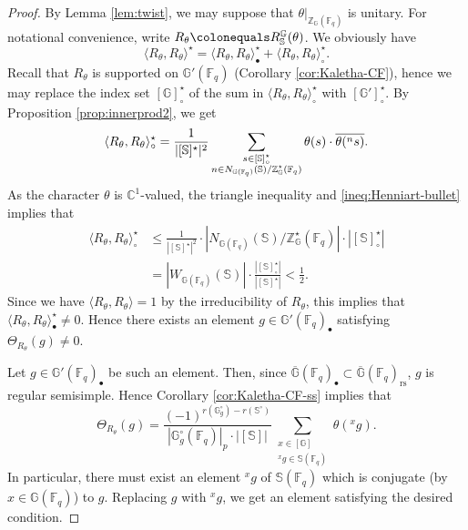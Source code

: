 \documentclass{amsart}
\newcommand{\rs}{\mathrm{rs}}
\newcommand{\F}{\mathbb{F}}
\newcommand{\FF}{\mathbb{F}}
\newcommand{\C}{\mathbb{C}}
\newcommand{\bbS}{\mathbb{S}}
\newcommand{\bbG}{\mathbb{G}}
\newcommand{\bbZ}{\mathbb{Z}}
\theoremstyle{plain}
\theoremstyle{definition}
\theoremstyle{remark}
\theoremstyle{theorem}
\begin{document}
\begin{proof}
By Lemma \ref{lem:twist}, we may suppose that $\theta|_{\bbZ_{\bbG}(\F_{q})}$ is unitary.
For notational convenience, write $R_\theta \colonequals R_{\bbS}^{\bbG}(\theta)$.
We obviously have
\[
\langle R_{\theta},R_{\theta}\rangle^{\star}
=
\langle R_{\theta},R_{\theta}\rangle^{\star}_{\bullet}
+
\langle R_{\theta},R_{\theta}\rangle^{\star}_{\circ}.
\]
Recall that $R_{\theta}$ is supported on $\bbG'(\F_{q})$ (Corollary \ref{cor:Kaletha-CF}), hence we may replace the index set $[\bbG]^{\star}_{\circ}$ of the sum in $\langle R_{\theta},R_{\theta}\rangle^{\star}_{\circ}$ with $[\bbG']^{\star}_{\circ}$.
By Proposition \ref{prop:innerprod2}, we get
\[
\langle R_{\theta},R_{\theta}\rangle^{\star}_{\circ}
=
\frac{1}{|[\bbS]^{\star}|^{2}}
\sum_{\begin{subarray}{c}s\in[\bbS]^{\star}_{\circ} \\ n\in N_{\bbG(\F_{q})}(\bbS)/\bbZ^{\star}_{\bbG}(\F_{q})\end{subarray}}
\theta(s)\cdot\overline{\theta({}^{n}s)}.
\]
As the character $\theta$ is $\C^{1}$-valued, the triangle inequality and \eqref{ineq:Henniart-bullet} implies that
\begin{align*}
\langle R_{\theta},R_{\theta}\rangle^{\star}_{\circ}
&\leq
\frac{1}{|[\bbS]^{\star}|^{2}}
\cdot|N_{\bbG(\F_{q})}(\bbS)/\bbZ^{\star}_{\bbG}(\F_{q})|
\cdot|[\bbS]^{\star}_{\circ}|\\
&=
|W_{\bbG(\F_{q})}(\bbS)|
\cdot\frac{|[\bbS]^{\star}_{\circ}|}{|[\bbS]^{\star}|}
<\frac{1}{2}.
\end{align*}
Since we have $\langle R_{\theta},R_{\theta}\rangle=1$ by the irreducibility of $R_{\theta}$, this implies that $\langle R_{\theta},R_{\theta}\rangle^{\star}_{\bullet}\neq0$.
Hence there exists an element $g\in\bbG'(\F_{q})_{\bullet}$ satisfying $\Theta_{R_{\theta}}(g)\neq 0$.

Let $g\in\bbG'(\F_{q})_{\bullet}$ be such an element.
Then, since $\overline{\bbG}(\F_{q})_{\bullet}\subset\overline{\bbG}(\F_{q})_{\rs}$, $g$ is regular semisimple.
Hence Corollary \ref{cor:Kaletha-CF-ss} implies that 
\[
\Theta_{R_{\theta}}(g)
=
\frac{(-1)^{r(\bbG_{g}^\circ) - r(\bbS^{\circ})}}{|\bbG_{g}^\circ(\FF_q)|_p \cdot |[\bbS]|} \sum_{\substack{x \in [\bbG] \\ {}^x g \in \bbS(\FF_q)}} \theta({}^x g).
\]
In particular, there must exist an element ${}^{x}g$ of $\bbS(\F_{q})$ which is conjugate (by $x\in\bbG(\F_{q})$) to $g$.
Replacing $g$ with ${}^{x}g$, we get an element satisfying the desired condition.
\end{proof}
\end{document}

